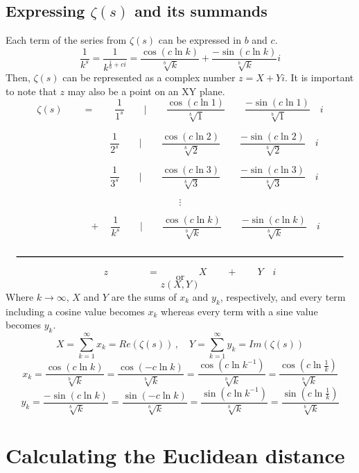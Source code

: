 \documentclass{amsart}
\begin{document}
	\subsection{Expressing $\zeta(s)$ and its summands}
	Each term of the series from $\zeta(s)$ can be expressed in $b$ and $c$.
	\[  \frac{1}{k^s} = \frac{1}{k^{\frac{1}{b} + ci}} = \frac{\cos({c\ln k})}{\sqrt[b]{k}} + \frac{-\sin({c\ln k})}{\sqrt[b]{k}} i \]
	Then, $\zeta(s)$ can be represented as a complex number $z = X + Yi$. It is important to note that $z$ may also be a point on an XY plane.
	\[ \zeta(s) \qquad = \qquad \frac{1}{1^s} \qquad \Big|  \qquad \frac{\cos({c\ln 1})}{\sqrt[b]{1}} \qquad \frac{-\sin({c\ln 1})}{\sqrt[b]{1}} \quad i  \]
	
	\[ \quad \qquad  \qquad \qquad \frac{1}{2^s} \qquad \Big|  \qquad \frac{\cos({c\ln 2})}{\sqrt[b]{2}} \qquad \frac{-\sin({c\ln 2})}{\sqrt[b]{2}} \quad i  \]
	
	\[ \quad \qquad  \qquad \qquad \frac{1}{3^s} \qquad \Big|  \qquad \frac{\cos({c\ln 3})}{\sqrt[b]{3}} \qquad \frac{-\sin({c\ln 3})}{\sqrt[b]{3}} \quad i  \]
	
	\[ \vdots \]
	
	\[ \qquad \qquad \quad + \quad \frac{1}{k^s} \qquad \Big|  \qquad \frac{\cos({c\ln k})}{\sqrt[b]{k}} \qquad \frac{-\sin({c\ln k})}{\sqrt[b]{k}} \quad i  \]
	
	\[\quad \rule{12 cm}{.8pt} \quad \]
	\[ \qquad \qquad \qquad z \qquad\qquad =  \qquad\qquad X \qquad + \qquad Y \quad i \qquad\qquad \]
	\[ \text{or} \]
	\[ z (X, Y) \]
	\[\]
	Where $k \to \infty$, $X$ and $Y$ are the sums of $x_k$ and $y_k$, respectively, and every term including a cosine value becomes $x_k$ whereas every term with a sine value becomes $y_k$. 
	\[ X = \sum\limits_{k=1}^{\infty}x_{k} = Re(\zeta(s)) \, , \quad Y = \sum\limits_{k=1}^{\infty}y_{k} = Im(\zeta(s)) \]
	\[\]
	\[ x_k = \frac{\cos({c\ln k})}{\sqrt[b]{k}} = \frac{\cos(-{c\ln k})}{\sqrt[b]{k}} = \frac{\cos({c\ln k^{-1}})}{\sqrt[b]{k}} = \frac{\cos({c\ln \frac{1}{k}})}{\sqrt[b]{k}} \]
	\[ y_k = \frac{-\sin({c\ln k})}{\sqrt[b]{k}} = \frac{\sin({-c\ln k})}{\sqrt[b]{k}} = \frac{\sin({c\ln k^{-1}})}{\sqrt[b]{k}} = \frac{\sin({c\ln \frac1k })}{\sqrt[b]{k}} \]
	
	
	
	
	
	
	
	\section{Calculating the Euclidean distance}
\end{document}
